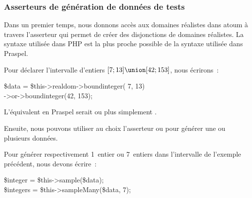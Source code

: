 \subsubsection{Asserteurs de génération de données de tests}

Dans un premier temps, nous donnons accès aux domaines réalistes dans atoum à
travers l'asserteur  qui permet de créer des disjonctions de
domaines réalistes. La syntaxe utilisée dans PHP est la plus proche possible de
la syntaxe utilisée dans Praspel.

\begin{example}

Pour déclarer l'intervalle d'entiers $[7; 13] \union [42; 153]$, nous écrirons~:
%
\begin{pre}
\$data = \$this->realdom->boundinteger( 7,  13) \\
                  ->or->boundinteger(42, 153);
\end{pre}
%
L'équivalent en Praspel serait  ou plus simplement .

\end{example}

Ensuite, nous pouvons utiliser au choix l'asserteur  ou
 pour générer une ou plusieurs données.

\begin{example}

Pour générer respectivement 1~entier ou 7~entiers dans l'intervalle de l'exemple
précédent, nous devons écrire~:
%
\begin{pre}
\$integer  = \$this->sample(\$data); \\
\$integers = \$this->sampleMany(\$data, 7);
\end{pre}

\end{example}

